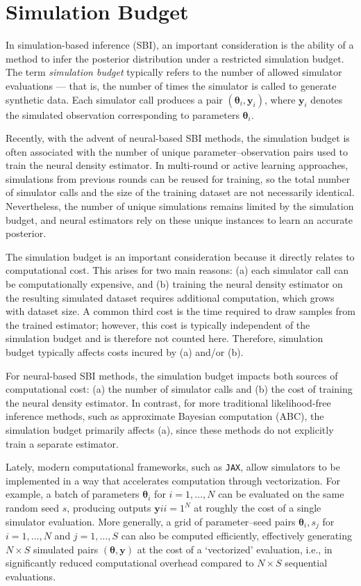 \section{Simulation Budget}
\label{app-sec:compute-budget}


In simulation-based inference (SBI), an important consideration is the ability of a method to infer the posterior distribution under a restricted simulation budget.
The term \textit{simulation budget} typically refers to the number of allowed simulator evaluations — that is, the number of times the simulator is called to generate synthetic data.
Each simulator call produces a pair $(\boldsymbol{\theta}_i, \mathbf{y}_i)$, where $\mathbf{y}_i$ denotes the simulated observation corresponding to parameters $\boldsymbol{\theta}_i$.

Recently, with the advent of neural-based SBI methods, the simulation budget is often associated with the number of unique parameter–observation pairs used to train the neural density estimator.
In multi-round or active learning approaches, simulations from previous rounds can be reused for training, so the total number of simulator calls and the size of the training dataset are not necessarily identical.
Nevertheless, the number of unique simulations remains limited by the simulation budget, and neural estimators rely on these unique instances to learn an accurate posterior.


The simulation budget is an important consideration because it directly relates to computational cost. This arises for two main reasons: (a) each simulator call can be computationally expensive, and (b) training the neural density estimator on the resulting simulated dataset requires additional computation, which grows with dataset size. A common third cost is the time required to draw samples from the trained estimator; however, this cost is typically independent of the simulation budget and is therefore not counted here.
Therefore, simulation budget typically affects costs incured by (a) and/or (b).

For neural-based SBI methods, the simulation budget impacts both sources of computational cost: (a) the number of simulator calls and (b) the cost of training the neural density estimator. In contrast, for more traditional likelihood-free inference methods, such as approximate Bayesian computation (ABC), the simulation budget primarily affects (a), since these methods do not explicitly train a separate estimator.

Lately, modern computational frameworks, such as \texttt{JAX}, allow simulators to be implemented in a way that accelerates computation through vectorization. For example, a batch of parameters ${\boldsymbol{\theta}_i}$ for $i=1, \ldots, N$ can be evaluated on the same random seed $s$, producing outputs ${\mathbf{y}i}{i=1}^N$ at roughly the cost of a single simulator evaluation.
More generally, a grid of parameter–seed pairs ${\boldsymbol{\theta}_i, s_j}$ for $i = 1, \dots, N$ and $j = 1, \dots, S$ can also be computed efficiently, effectively generating $N \times S$ simulated pairs $(\boldsymbol{\theta}, \mathbf{y})$ at the cost of a `vectorized' evaluation, i.e., in significantly reduced computational overhead compared to $N \times S$ sequential evaluations.


